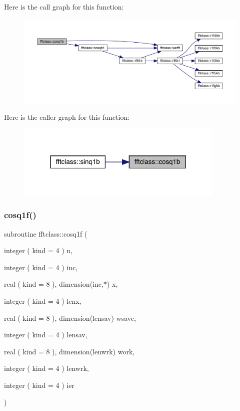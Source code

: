 Here is the call graph for this function\+:\nopagebreak
\begin{figure}[H]
\begin{center}
\leavevmode
\includegraphics[width=350pt]{namespacefftclass_a6684b378360642f160b255df6b3aa0bd_cgraph}
\end{center}
\end{figure}
Here is the caller graph for this function\+:\nopagebreak
\begin{figure}[H]
\begin{center}
\leavevmode
\includegraphics[width=283pt]{namespacefftclass_a6684b378360642f160b255df6b3aa0bd_icgraph}
\end{center}
\end{figure}
\mbox{\label{namespacefftclass_a546e80f6eb00444bf4508ae26186e0d2}} 
\subsubsection{\texorpdfstring{cosq1f()}{cosq1f()}}
{\footnotesize\ttfamily subroutine fftclass\+::cosq1f (\begin{DoxyParamCaption}\item[{integer ( kind = 4 )}]{n,  }\item[{integer ( kind = 4 )}]{inc,  }\item[{real ( kind = 8 ), dimension(inc,$\ast$)}]{x,  }\item[{integer ( kind = 4 )}]{lenx,  }\item[{real ( kind = 8 ), dimension(lensav)}]{wsave,  }\item[{integer ( kind = 4 )}]{lensav,  }\item[{real ( kind = 8 ), dimension(lenwrk)}]{work,  }\item[{integer ( kind = 4 )}]{lenwrk,  }\item[{integer ( kind = 4 )}]{ier }\end{DoxyParamCaption})}

